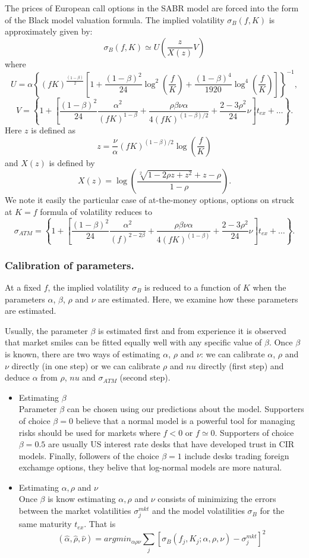 \documentclass{book}
\begin{document}
The prices of European call options in the SABR model are forced into the form of the Black model valuation formula. The implied volatility $\sigma_{B}(f,K)$ is approximately given by:
$$
\sigma_{B}(f,K)\simeq U\left(\frac{z}{X(z)}V\right)
$$
where
$$
U=\alpha\left\{(fK)^{\frac{(1-\beta)}{2}}\left[1+\frac{(1-\beta)^{2}}{24}\log^{2}\left(\frac{f}{K}\right)+\frac{(1-\beta)^{4}}{1920}\log^{4}\left(\frac{f}{K}\right)\right]\right\}^{-1},
$$
$$
V=\left\{1+\left[\frac{(1-\beta)^{2}}{24}\frac{\alpha^{2}}{(fK)^{1-\beta}}+\frac{\rho\beta\nu\alpha}{4(fK)^{(1-\beta)/2}}+\frac{2-3\rho^{2}}{24}\nu\right]t_{ex}+\dots\right\}.
$$
Here $z$ is defined as 
$$
z=\frac{\nu}{\alpha}(fK)^{(1-\beta)/2}\log(\frac{f}{K})
$$
and $X(z)$ is defined by
$$
X(z)=\log\left(\frac{\sqrt[2]{1-2\rho z+z^{2}}+z-\rho}{1-\rho}\right).
$$
We note it easily the particular case of at-the-money options, options on struck at $K = f$ formula of volatility reduces to
$$
\sigma_{ATM}=\left\{1+\left[\frac{(1-\beta)^{2}}{24}\frac{\alpha^{2}}{(f)^{2-2\beta}}+\frac{\rho\beta\nu\alpha}{4(fK)^{(1-\beta)}}+\frac{2-3\rho^{2}}{24}\nu\right]t_{ex}+\dots\right\}.
$$
\subsubsection{Calibration of parameters.}
At a fixed $f$, the implied volatility $\sigma_{B}$ is reduced to a function of $K$ when the parameters $\alpha$, $\beta$, $\rho$ and $\nu$ are estimated. Here, we examine how these parameters are estimated.

Usually, the parameter $\beta$ is estimated first and from experience it is observed that market smiles can be fitted equally well with any specific value of $\beta$. Once $\beta$ is known, there are two ways of estimating $\alpha$, $\rho$ and $\nu$: we can calibrate $\alpha$, $\rho$ and $\nu$ directly (in one step) or we can calibrate $\rho$ and $nu$ directly (first step) and deduce $\alpha$ from $\rho$, $nu$ and $\sigma_{ATM}$ (second step).

\begin{itemize}
\item Estimating $\beta$\\
Parameter $\beta$ can be chosen using our predictions about the model. Supporters of choice $\beta=0$ believe that a normal model is a powerful tool for managing risks should be used for markets where $f<0$ or $f \simeq 0$. Supporters of choice $\beta=0.5$ are usually US interest rate desks that have developed trust in CIR models. Finally, followers of the choice $\beta=1$ include desks trading foreign exchamge options, they belive that log-normal models are more natural.
\item Estimating $\alpha,\rho$ and $\nu$\\
Once $\beta$ is know estimating $\alpha,\rho$ and $\nu$ consists of minimizing the errors between the market volatilities $\sigma_{j}^{mkt}$ and the model volatilities $\sigma_{B}$ for the same maturity $t_{ex}.$ That is
$$
(\hat{\alpha},\hat{\rho},\hat{\nu})=argmin_{\alpha\rho\nu}\sum_{j}[\sigma_{B}(f_{j},K_{j};\alpha,\rho,\nu)-\sigma_{j}^{mkt}]^{2}
$$
\end{itemize}
\end{document}
